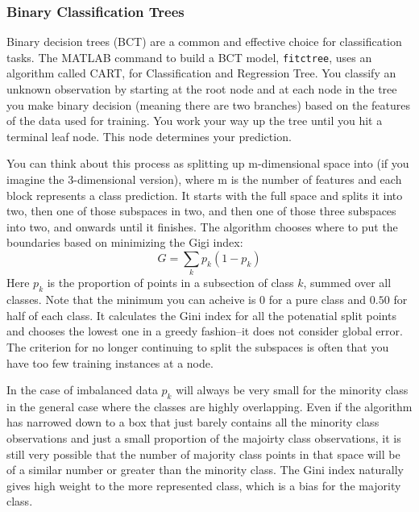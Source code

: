 \documentclass{article}
\begin{document}
\subsubsection{Binary Classification Trees}

Binary decision trees (BCT) are a common and effective choice for classification tasks.
The MATLAB command to build a BCT model, \texttt{fitctree}, uses an algorithm called CART, for Classification and Regression Tree. You classify an unknown observation by starting at the root node and at each node in the tree you make binary decision (meaning there are two branches) based on the features of the data used for training. You work your way up the tree until you hit a terminal leaf node. This node determines your prediction.

You can think about this process as splitting up m-dimensional space into  (if you imagine the 3-dimensional version), where m is the number of features and each block represents a class prediction. It starts with the full space and splits it into two, then one of those subspaces in two, and then one of those three subspaces into two, and onwards until it finishes.
The algorithm chooses where to put the boundaries based on minimizing the Gigi index:
\begin{equation}
G={\textstyle \sum_{k}p_{k}(1-p_{k})}
\end{equation}
Here $p_k$ is the proportion of points in a subsection of class $k$, summed over all classes.
Note that the minimum you can acheive is 0 for a pure class and $0.50$ for half of each class. It calculates the Gini index for all the potenatial split points and chooses the lowest one in a greedy fashion--it does not consider global error. The criterion for no longer continuing to split the subspaces is often that you have too few training instances at a node.

In the case of imbalanced data $p_k$ will always be very small for the minority class in the general case where the classes are highly overlapping. Even if the algorithm has narrowed down to a box that just barely contains all the minority class observations and just a small proportion of the majoirty class observations, it is still very possible that the number of majority class points in that space will be of a similar number or greater than the minority class. The Gini index naturally gives high weight to the more represented class, which is a bias for the majority class.
\end{document}
